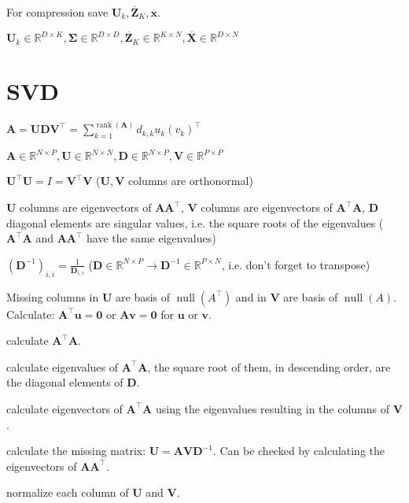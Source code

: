 \documentclass[a4paper, 11pt, landscape]{article}
\begin{document}
\begin{multicols*}{3}
\begin{compactitem}
	\item For compression save $\mathbf{U}_k, \overline{\mathbf{Z}}_K, \overline{\mathbf{x}}$.
	\item $\mathbf{U}_k \in \mathbb{R}^{D \times K}, \boldsymbol{\Sigma} \in \mathbb{R}^{D \times D}, \overline{\mathbf{Z}}_K \in \mathbb{R}^{K \times N}, \overline{\mathbf{X}} \in \mathbb{R}^{D \times N}$
\end{compactitem}

\section{SVD}
\begin{inparaitem}[\color{red}\textbullet]
	\item $\mathbf{A} = \mathbf{U} \mathbf{D} \mathbf{V}^\top = \sum_{k=1}^{\operatorname{rank}(\mathbf{A})} d_{k,k} u_k (v_k)^\top$
	\item $\mathbf{A} \in \mathbb{R}^{N \times P}, \mathbf{U} \in \mathbb{R}^{N \times N}, \mathbf{D} \in \mathbb{R}^{N \times P}, \mathbf{V} \in \mathbb{R}^{P \times P}$
	\item $\mathbf{U}^\top \mathbf{U} = I = \mathbf{V}^\top \mathbf{V}$ ($\mathbf{U}, \mathbf{V}$ columns are orthonormal)
	\item $\mathbf{U}$ columns are eigenvectors of $\mathbf{A} \mathbf{A}^\top$, $\mathbf{V}$ columns are eigenvectors of $\mathbf{A}^\top \mathbf{A}$, $\mathbf{D}$ diagonal elements are singular values, i.e. the square roots of the eigenvalues ($\mathbf{A}^\top \mathbf{A}$ and $\mathbf{A} \mathbf{A}^\top$ have the same eigenvalues)
	\item $(\mathbf{D}^{-1})_{i,i} = \frac{1}{\mathbf{D}_{i, i}}$ ($\mathbf{D} \in \mathbb{R}^{N \times P} \to \mathbf{D}^{-1} \in \mathbb{R}^{P \times N}$, i.e. don't forget to transpose)
	\item Missing columns in $\mathbf{U}$ are basis of $\operatorname{null}(A^\top)$ and in $\mathbf{V}$ are basis of $\operatorname{null}(A)$. Calculate: $\mathbf{A}^\top \mathbf{u} = \mathbf{0}$ or $\mathbf{A} \mathbf{v} = \mathbf{0}$ for $\mathbf{u}$ or $\mathbf{v}$.
\end{inparaitem}

\begin{compactenum}
	\item calculate $\mathbf{A}^\top \mathbf{A}$.
	\item calculate eigenvalues of $\mathbf{A}^\top \mathbf{A}$, the square root of them, in descending order, are the diagonal elements of $\mathbf{D}$.
	\item calculate eigenvectors of $\mathbf{A}^\top \mathbf{A}$ using the eigenvalues resulting in the columns of $\mathbf{V}$.
	\item calculate the missing matrix: $\mathbf{U} = \mathbf{A} \mathbf{V} \mathbf{D}^{-1}$. Can be checked by calculating the eigenvectors of $\mathbf{A} \mathbf{A}^\top$.
	\item normalize each column of $\mathbf{U}$ and $\mathbf{V}$.
\end{compactenum}


\end{multicols*}
\end{document}
